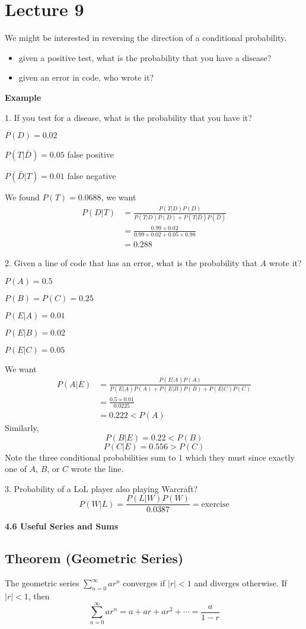 \section{Lecture 9}
We might be interested in reversing the direction of a conditional
probability.
\begin{itemize}
    \item given a positive test, what is the probability that you have a disease?
    \item given an error in code, who wrote it?
\end{itemize}

\textbf{Example}

1. If you test for a disease, what is the probability that you have it?

$ P(D)=0.02 $

$ P(T|\bar{D})=0.05 $ false positive

$ P(\bar{D}|T)=0.01 $ false negative

We found $ P(T)=0.0688 $, we want
\begin{align*}
    P(D|T)&=\frac{P(T|D)P(D)}{P(T|D)P(D)+P(T|\bar{D})P(\bar{D})}\\
    &=\frac{0.99\times 0.02}{0.99\times 0.02+0.05\times 0.98}\\
    &=0.288
\end{align*}

2. Given a line of code that has an error, what is the probability that
$ A $ wrote it?

$ P(A)=0.5 $

$ P(B)=P(C)=0.25 $

$ P(E|A)=0.01 $

$ P(E|B)=0.02 $

$ P(E|C)=0.05 $

We want
\begin{align*}
    P(A|E)&=\frac{P(E|A)P(A)}{P(E|A)P(A)+P(E|B)P(B)+P(E|C)P(C)}\\
    &=\frac{0.5\times 0.01}{0.0225}\\
    &=0.222<P(A)
\end{align*}
Similarly,
\[ P(B|E)=0.22<P(B) \]
\[ P(C|E)=0.556>P(C) \]
Note the three conditional probabilities sum to $ 1 $ which they must since exactly
one of $ A $, $ B $, or $ C $ wrote the line.

3. Probability of a LoL player also playing Warcraft?
\[ P(W|L)=\frac{P(L|W)P(W)}{0.0387}=\text{exercise} \]

\textbf{4.6 Useful Series and Sums}

\begin{thmbox}
    \subsection{Theorem (Geometric Series)}
    The geometric series $ \sum\limits_{n=0}^{\infty} ar^n $ converges
    if $ |r|<1 $ and diverges otherwise. If $ |r|<1 $, then
    \[ \sum\limits_{n=0}^{\infty} ar^n=a+ar+ar^2+\cdots =\frac{a}{1-r}  \]
\end{thmbox}

